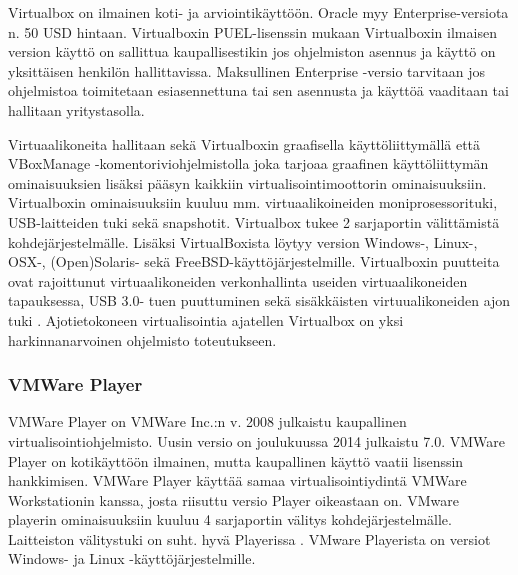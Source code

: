 
Virtualbox on ilmainen koti- ja arviointikäyttöön. Oracle myy Enterprise-versiota n. 50 USD hintaan.
Virtualboxin PUEL-lisenssin mukaan Virtualboxin ilmaisen version käyttö on sallittua kaupallisestikin jos ohjelmiston asennus ja käyttö on yksittäisen henkilön hallittavissa. Maksullinen Enterprise -versio tarvitaan jos ohjelmistoa toimitetaan esiasennettuna tai sen asennusta ja käyttöä vaaditaan tai hallitaan yritystasolla.\cite{virtualbox_puel}\cite{virtualbox_licensing}

Virtuaalikoneita hallitaan sekä Virtualboxin graafisella käyttöliittymällä että VBoxManage -komentoriviohjelmistolla joka tarjoaa graafinen käyttöliittymän ominaisuuksien lisäksi pääsyn kaikkiin virtualisointimoottorin ominaisuuksiin\cite{virtualbox_manual}. Virtualboxin ominaisuuksiin kuuluu mm. virtuaalikoineiden moniprosessorituki, USB-laitteiden tuki sekä snapshotit. Virtualbox tukee 2 sarjaportin välittämistä kohdejärjestelmälle. Lisäksi VirtualBoxista löytyy version Windows-, Linux-, OSX-, (Open)Solaris- sekä FreeBSD-käyttöjärjestelmille. Virtualboxin puutteita ovat rajoittunut virtuaalikoneiden verkonhallinta useiden virtuaalikoneiden tapauksessa, USB 3.0- tuen puuttuminen sekä sisäkkäisten virtuualikoneiden ajon tuki \cite{vplayervsvbox}. Ajotietokoneen virtualisointia ajatellen Virtualbox on yksi harkinnanarvoinen ohjelmisto toteutukseen.


\subsubsection{VMWare Player}
VMWare Player on VMWare Inc.:n v. 2008 julkaistu kaupallinen virtualisointiohjelmisto. Uusin versio on joulukuussa 2014 julkaistu 7.0. VMWare Player on kotikäyttöön ilmainen, mutta kaupallinen käyttö vaatii lisenssin hankkimisen. VMWare Player käyttää samaa virtualisointiydintä VMWare Workstationin kanssa, josta riisuttu versio Player oikeastaan on. VMware playerin ominaisuuksiin kuuluu 4 sarjaportin välitys kohdejärjestelmälle. Laitteiston välitystuki on suht. hyvä Playerissa . VMware Playerista on versiot Windows- ja Linux -käyttöjärjestelmille. \cite{vmware1}


